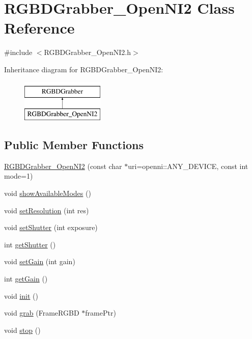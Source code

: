 \hypertarget{classRGBDGrabber__OpenNI2}{\section{R\-G\-B\-D\-Grabber\-\_\-\-Open\-N\-I2 Class Reference}
\label{classRGBDGrabber__OpenNI2}
}


{\ttfamily \#include $<$R\-G\-B\-D\-Grabber\-\_\-\-Open\-N\-I2.\-h$>$}

Inheritance diagram for R\-G\-B\-D\-Grabber\-\_\-\-Open\-N\-I2\-:\begin{figure}[H]
\begin{center}
\leavevmode
\includegraphics[height=2.000000cm]{classRGBDGrabber__OpenNI2}
\end{center}
\end{figure}
\subsection*{Public Member Functions}
\begin{DoxyCompactItemize}
\item 
\hyperlink{classRGBDGrabber__OpenNI2_ab345f03078f20ffb30edccbf2ef70892}{R\-G\-B\-D\-Grabber\-\_\-\-Open\-N\-I2} (const char $\ast$uri=openni\-::\-A\-N\-Y\-\_\-\-D\-E\-V\-I\-C\-E, const int mode=1)
\item 
void \hyperlink{classRGBDGrabber__OpenNI2_aaf62639ea4a14acac0fee7e11fdc5bf9}{show\-Available\-Modes} ()
\item 
void \hyperlink{classRGBDGrabber__OpenNI2_a6d6ba5b908bcdf8442bd083958b38036}{set\-Resolution} (int res)
\item 
void \hyperlink{classRGBDGrabber__OpenNI2_aeebcaa5079629654dc30f0fdbaacea61}{set\-Shutter} (int exposure)
\item 
int \hyperlink{classRGBDGrabber__OpenNI2_a68dc63b53be20c9feecbb7d78c5121c3}{get\-Shutter} ()
\item 
void \hyperlink{classRGBDGrabber__OpenNI2_a7a3d58b840b8c6b049bb8aa5e043e935}{set\-Gain} (int gain)
\item 
int \hyperlink{classRGBDGrabber__OpenNI2_a3e3e079f580c988ec37369ab1a468c1c}{get\-Gain} ()
\item 
void \hyperlink{classRGBDGrabber__OpenNI2_afbf7a0c2b858bad4d660104386073bb8}{init} ()
\item 
void \hyperlink{classRGBDGrabber__OpenNI2_affad3812ddfff63085e03a30686db3ac}{grab} (Frame\-R\-G\-B\-D $\ast$frame\-Ptr)
\item 
void \hyperlink{classRGBDGrabber__OpenNI2_af986000241075e4e7cc0343b391d2eb6}{stop} ()
\end{DoxyCompactItemize}

